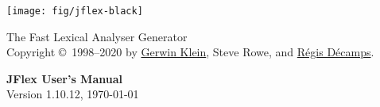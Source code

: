 \documentclass[11pt]{scrartcl}
\begin{document}
\centerline{\texttt{[image: fig/jflex-black]}}

\begin{center}
\sffamily
{\Large The Fast Lexical Analyser Generator}\\
\smallskip\smallskip
Copyright \copyright\ 1998--2020 by \href{http://www.doclsf.de}{Gerwin Klein},
Steve Rowe, and \href{http://regis.decamps.info/}{R\'egis D\'ecamps}.

\vspace*{15ex}
{\Huge \sffamily \bfseries JFlex User's Manual}\\
\bigskip
Version 1.10.12, {\today}
\end{center}

\newpage
\tableofcontents
\newpage













\newpage



\end{document}
